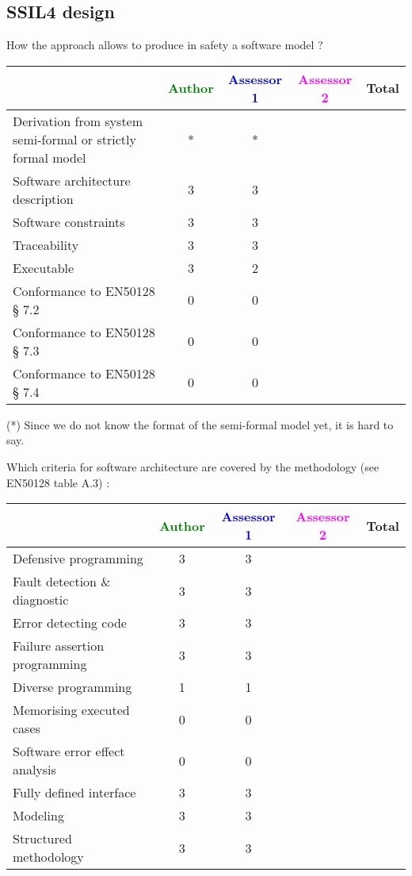 \subsection{SSIL4 design}

How the approach allows to  produce in safety a software model ?

\begin{tabular}{|l | c | c | c | c|}
\hline
& \textcolor{green}{Author} & \textcolor{blue}{Assessor 1} & \textcolor{magenta}{Assessor 2} & Total \\
\hline
Derivation from system semi-formal or strictly formal model  &* &* & &  \\
\hline 
Software architecture description  &3 &3 & &  \\
\hline
Software constraints  &3 &3 & &  \\
\hline
Traceability  &3 &3 & &  \\
\hline
Executable  &3 &2 & &  \\
\hline
Conformance to EN50128 § 7.2  &0 &0 & &  \\
\hline
Conformance to EN50128 § 7.3  &0 &0 & &  \\
\hline
Conformance to EN50128 § 7.4  &0 &0 & &  \\
\hline
\end{tabular}
\begin{author_comment}
(*) Since we do not know the format of the semi-formal model  yet, it is hard to say.
\end{author_comment}

Which criteria for software architecture are covered by the methodology
(see EN50128 table A.3) :

\begin{tabular}{|l | c | c | c | c|}
\hline
& \textcolor{green}{Author} & \textcolor{blue}{Assessor 1} & \textcolor{magenta}{Assessor 2} & Total \\
\hline
Defensive programming  &3 &3 & &  \\
\hline 
Fault detection \& diagnostic  &3 &3 & &  \\
\hline
Error detecting code  &3 &3 & &  \\
\hline
Failure assertion programming &3 &3 & &  \\
\hline
Diverse programming &1 &1 & &  \\
\hline
Memorising executed cases &0 &0 & &  \\
\hline
Software error effect analysis &0 &0 & &  \\
\hline
Fully defined interface &3 &3 & &  \\
\hline
Modeling  &3 &3 & &  \\
\hline
Structured methodology &3 &3 & &  \\
\hline
\end{tabular}

